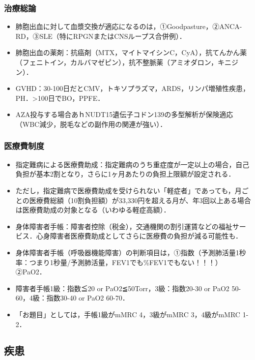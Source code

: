 \subsubsection{治療総論}

\begin{itemize}
\item 肺胞出血に対して血漿交換が適応になるのは，①Goodpasture，②ANCA-RD，③SLE（特にRPGNまたはCNSループス合併例）．
\item 肺胞出血の薬剤：抗癌剤（MTX，マイトマイシンC，CyA），抗てんかん薬（フェニトイン，カルバマゼピン），抗不整脈薬（アミオダロン，キニジン）．
\item GVHD：30-100日だとCMV，トキソプラズマ，ARDS，リンパ増殖性疾患，PH．>100日でBO，PPFE．
\item AZA投与する場合あｈNUDT15遺伝子コドン139の多型解析が保険適応（WBC減少，脱毛などの副作用の関連が強い）．
\end{itemize}

\subsubsection{医療費制度}

\begin{itemize}
\item 指定難病による医療費助成：指定難病のうち重症度が一定以上の場合，自己負担が基本2割となり，さらに1ヶ月あたりの負担上限額が設定される．
\item ただし，指定難病で医療費助成を受けられない「軽症者」であっても，月ごとの医療費総額（10割負担額）が33,330円を超える月が、年3回以上ある場合は医療費助成の対象となる（いわゆる軽症高額）．
\item 身体障害者手帳：障害者控除（税金），交通機関の割引運賃などの福祉サービス．心身障害者医療費助成としてさらに医療費の負担が減る可能性も．
\item 身体障害者手帳（呼吸器機能障害）の判断項目は，①指数（予測肺活量1秒率：つまり1秒量/予測肺活量，FEV1でも\%FEV1でもない！！！）②PaO2．
\item 障害者手帳1級：指数≦20 or PaO2≦50Torr，3級：指数20-30 or PaO2 50-60，4級：指数30-40 or PaO2 60-70．
\item 「お題目」としては，手帳1級がmMRC 4，3級がmMRC 3，4級がmMRC 1-2．
\end{itemize}

\subsection{疾患}

